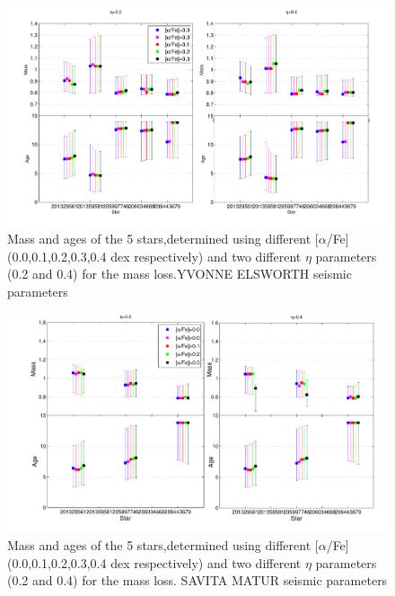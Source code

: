 \documentclass{aa}
\begin{document}
\begin{appendix}

\begin{figure}
\centering
\includegraphics[width=1.7\columnwidth]{./Figures/agesYvonne.pdf}
\caption{Mass and ages of the 5 stars,determined using different [$\alpha$/Fe] (0.0,0.1,0.2,0.3,0.4 dex respectively) and two different $\eta$ parameters (0.2 and 0.4) for the mass loss.YVONNE ELSWORTH seismic parameters}
\label{Fig:agesYvonne}%
\end{figure}


\begin{figure}
\centering
\includegraphics[width=1.7\columnwidth]{./Figures/agesSavita.pdf}
\caption{Mass and ages of the 5 stars,determined using different [$\alpha$/Fe] (0.0,0.1,0.2,0.3,0.4 dex respectively) and two different $\eta$ parameters (0.2 and 0.4) for the mass loss. SAVITA MATUR seismic parameters}
\label{Fig:agesSavita}%
\end{figure}


\end{appendix}
\end{document}
